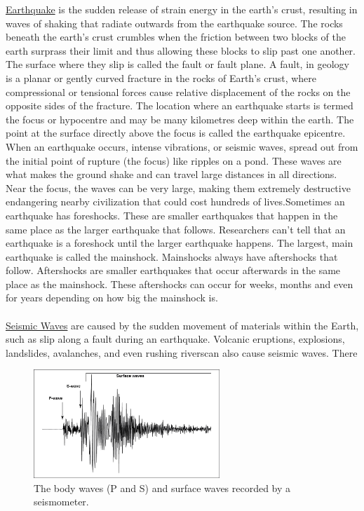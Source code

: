 \documentclass{article}
\begin{document}
\noindent \underline{Earthquake} is the sudden release of strain energy in the earth's crust, resulting in waves of shaking that radiate outwards from the earthquake source. The rocks beneath the earth's crust crumbles when the friction between two blocks of the earth surprass their limit and thus allowing these blocks to slip past one another\cite*{earthquake}. The surface where they slip is called the fault or fault plane\cite*{SciEarth}. A fault, in geology is a planar or gently curved fracture in the rocks of Earth's crust, where compressional or tensional forces cause relative displacement of the rocks on the opposite sides of the fracture\cite*{fault}. The location where an earthquake starts is termed the focus or hypocentre and may be many kilometres deep within the earth. The point at the surface directly above the focus is called the earthquake epicentre\cite*{SciEarth}. When an earthquake occurs, intense vibrations, or seismic waves, spread out from the initial point of rupture (the focus) like ripples on a pond. These waves are what makes the ground shake and can travel large distances in all directions. Near the focus, the waves can be very large, making them extremely destructive endangering nearby civilization that could cost hundreds of lives\cite*{earthquake}.Sometimes an earthquake has foreshocks. These are smaller earthquakes that happen in the same place as the larger earthquake that follows. Researchers can't tell that an earthquake is a foreshock until the larger earthquake happens. The largest, main earthquake is called the mainshock. Mainshocks always have aftershocks that follow. Aftershocks are smaller earthquakes that occur afterwards in the same place as the mainshock. These aftershocks can occur for weeks, months and even for years depending on how big the mainshock is\cite*{SciEarth}.\\\\ 
\underline{Seismic Waves} are caused by the sudden movement of materials  within the Earth, such as slip along a fault during an earthquake.  Volcanic eruptions, explosions, landslides, avalanches, and even rushing riverscan also cause  seismic waves.     There 
\begin{figure}
    \includegraphics[width=7cm]{waves.jpg}
    \caption{The body waves (P and S) and surface waves recorded by a seismometer.}\label{wrap-fig:1}
\end{figure} 
\end{document}
